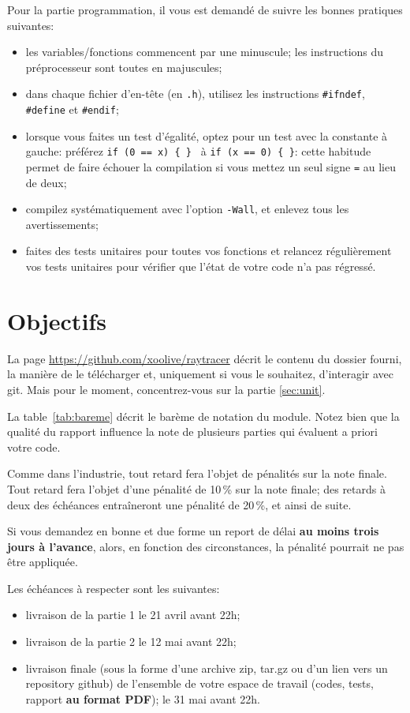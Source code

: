 \documentclass[10pt, a4paper ]{article}
\begin{document}
Pour la partie programmation, il vous est demandé de suivre les bonnes pratiques
suivantes:
\begin{itemize}
    \item les variables/fonctions commencent par une minuscule; les instructions
        du préprocesseur sont toutes en majuscules;
    \item dans chaque fichier d'en-tête (en \texttt{.h}), utilisez les
        instructions \texttt{\#ifndef}, \texttt{\#define} et \texttt{\#endif};
    \item lorsque vous faites un test d'égalité, optez pour un test avec la
        constante à gauche: préférez \texttt{if (0 == x) \{ \} } à
        \texttt{if (x == 0) \{ \}}: cette habitude permet de faire échouer la
        compilation si vous mettez un seul signe \texttt{=} au lieu de deux;
    \item compilez systématiquement avec l'option \texttt{-Wall}, et enlevez
        tous les avertissements;
    \item faites des tests unitaires pour toutes vos fonctions et relancez
        régulièrement vos tests unitaires pour vérifier que l'état de votre code
        n'a pas régressé.
\end{itemize}


\section{Objectifs}

La page \url{https://github.com/xoolive/raytracer} décrit le contenu du dossier
fourni, la manière de le télécharger et, uniquement si vous le souhaitez,
d'interagir avec git. Mais pour le moment, concentrez-vous sur la partie
\ref{sec:unit}.

La table~\ref{tab:bareme} décrit le barème de notation du module. Notez bien que
la qualité du rapport influence la note de plusieurs parties qui évaluent a
priori votre code.

Comme dans l'industrie, tout retard fera l'objet de pénalités sur la note
finale. Tout retard fera l'objet d'une pénalité de 10\,\% sur la note finale;
des retards à deux des échéances entraîneront une pénalité de 20\,\%, et ainsi
de suite.

Si vous demandez en bonne et due forme un report de délai \textbf{au moins trois
jours à l'avance}, alors, en fonction des circonstances, la pénalité pourrait
ne pas être appliquée.

Les échéances à respecter sont les suivantes:
\begin{itemize}
    \item livraison de la partie 1 le 21 avril avant 22h;
    \item livraison de la partie 2 le 12 mai avant 22h;
    \item livraison finale (sous la forme d'une archive zip, tar.gz ou d'un lien
        vers un repository github) de l'ensemble de votre espace de travail
        (codes, tests, rapport \textbf{au format PDF}); le 31 mai avant 22h.
\end{itemize}
\end{document}
